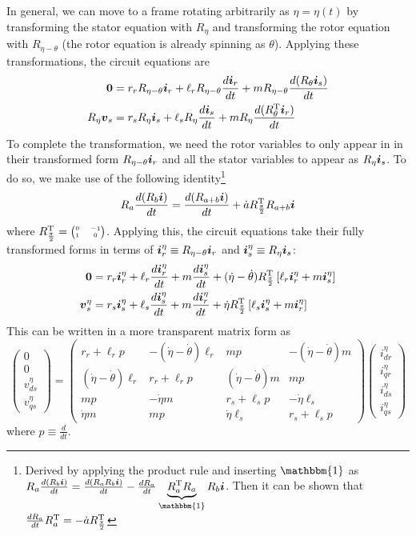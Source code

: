 \documentclass[onecolumn]{gwclass}
\begin{document}
In general, we can move to a frame rotating arbitrarily as $\eta=\eta(t)$ by transforming the stator equation with $R_\eta$ and transforming the rotor equation with $R_{\eta-\theta}$ (the rotor equation is already spinning as $\theta$). Applying these transformations, the circuit equations are
\begin{align*}
	\boldsymbol{0} &= r_rR_{\eta-\theta}\boldsymbol{i}_r + \ell_rR_{\eta-\theta}\frac{d\boldsymbol{i}_r}{dt} + mR_{\eta-\theta}\frac{d(R_\theta\boldsymbol{i}_s)}{dt} \\
	R_\eta\boldsymbol{v}_s &= r_sR_\eta\boldsymbol{i}_s + \ell_sR_\eta\frac{d\boldsymbol{i}_s}{dt} + mR_\eta\frac{d(R_\theta^{\text{\normalfont{T}}}\boldsymbol{i}_r)}{dt}
\end{align*}
To complete the transformation, we need the rotor variables to only appear in in their transformed form $R_{\eta-\theta}\boldsymbol{i}_r$ and all the stator variables to appear as $R_\eta\boldsymbol{i}_s$. To do so, we make use of the following identity\footnote{Derived by applying the product rule and inserting $\mathbbm{1}$ as $R_a\frac{d(R_b\*i)}{dt} = \frac{d(R_aR_b\*i)}{dt} - \frac{dR_a}{dt}\underbrace{R_a^\t{T}R_a}_{\mathbbm{1}}R_b\*i$. Then it can be shown that $\frac{dR_a}{dt}R_a^{\text{\normalfont{T}}} = - \dot{a}R_{\frac{\pi}{2}}^{\text{\normalfont{T}}}$ }
$$ R_a \frac{d(R_b\boldsymbol{i})}{dt} = \frac{d(R_{a+b}\boldsymbol{i})}{dt} + \dot{a}R_{\frac{\pi}{2}}^{\text{\normalfont{T}}}R_{a+b}\boldsymbol{i} $$
where $R_{\frac{\pi}{2}}^{\text{\normalfont{T}}}=\tiny\begin{pmatrix}
	0 & -1\\ 1 & 0
\end{pmatrix}$. Applying this, the circuit equations take their fully transformed forms in terms of $\boldsymbol{i}_r^\eta\equiv R_{\eta-\theta}\boldsymbol{i}_r$ and $\boldsymbol{i}_s^\eta\equiv R_\eta\boldsymbol{i}_s$:
\begin{align*}
	\boldsymbol{0} &= r_r\boldsymbol{i}_r^\eta + \ell_r\frac{d\boldsymbol{i}_r^\eta}{dt} + m\frac{d\boldsymbol{i}_s^\eta}{dt} + (\dot{\eta}-\dot{\theta})R_{\frac{\pi}{2}}^{\text{\normalfont{T}}}\left[\ell_r\boldsymbol{i}_r^\eta + m\boldsymbol{i}_s^\eta\right]\\
	\boldsymbol{v}_s^\eta &= r_s\boldsymbol{i}_s^\eta + \ell_s\frac{d\boldsymbol{i}_s^\eta}{dt} +m \frac{d\boldsymbol{i}_r^\eta}{dt} + \dot{\eta}R_{\frac{\pi}{2}}^{\text{\normalfont{T}}}\left[ \ell_s\boldsymbol{i}_s^\eta + m\boldsymbol{i}_r^\eta \right]
\end{align*}
This can be written in a more transparent matrix form as
$$ \begin{pmatrix}
	0 \\
	0\\
	v_{ds}^\eta \\
	v_{qs}^\eta
\end{pmatrix} = 
\begin{pmatrix}
	r_r + \ell_r p & -(\dot{\eta}-\dot{\theta})\ell_r & mp & -(\dot{\eta} - \dot{\theta})m \\
	(\dot{\eta}-\dot{\theta})\ell_r & r_r + \ell_r p & (\dot{\eta}-\dot{\theta})m & mp \\
	mp & -\dot{\eta}m & r_s + \ell_sp & -\dot{\eta}\ell_s  \\
	\dot{\eta}m & mp & \dot{\eta}\ell_s & r_s + \ell_s p
\end{pmatrix}\begin{pmatrix}
i_{dr}^\eta\\
i_{qr}^\eta\\
i_{ds}^\eta\\
i_{qs}^\eta
\end{pmatrix}$$
where $p\equiv\frac{d}{dt}$.
\end{document}
